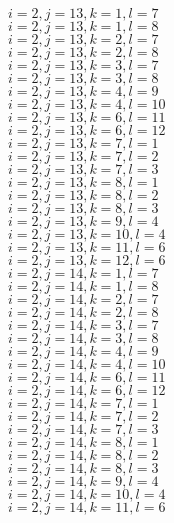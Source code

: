 \documentclass[14pt]{article}
\begin{document}
    $i=2,j=13,k=1,l=7 $ \\ 
    $i=2,j=13,k=1,l=8 $ \\ 
    $i=2,j=13,k=2,l=7 $ \\ 
    $i=2,j=13,k=2,l=8 $ \\ 
    $i=2,j=13,k=3,l=7 $ \\ 
    $i=2,j=13,k=3,l=8 $ \\ 
    $i=2,j=13,k=4,l=9 $ \\ 
    $i=2,j=13,k=4,l=10 $ \\ 
    $i=2,j=13,k=6,l=11 $ \\ 
    $i=2,j=13,k=6,l=12 $ \\ 
    $i=2,j=13,k=7,l=1 $ \\ 
    $i=2,j=13,k=7,l=2 $ \\ 
    $i=2,j=13,k=7,l=3 $ \\ 
    $i=2,j=13,k=8,l=1 $ \\ 
    $i=2,j=13,k=8,l=2 $ \\ 
    $i=2,j=13,k=8,l=3 $ \\ 
    $i=2,j=13,k=9,l=4 $ \\ 
    $i=2,j=13,k=10,l=4 $ \\ 
    $i=2,j=13,k=11,l=6 $ \\ 
    $i=2,j=13,k=12,l=6 $ \\ 
    $i=2,j=14,k=1,l=7 $ \\ 
    $i=2,j=14,k=1,l=8 $ \\ 
    $i=2,j=14,k=2,l=7 $ \\ 
    $i=2,j=14,k=2,l=8 $ \\ 
    $i=2,j=14,k=3,l=7 $ \\ 
    $i=2,j=14,k=3,l=8 $ \\ 
    $i=2,j=14,k=4,l=9 $ \\ 
    $i=2,j=14,k=4,l=10 $ \\ 
    $i=2,j=14,k=6,l=11 $ \\ 
    $i=2,j=14,k=6,l=12 $ \\ 
    $i=2,j=14,k=7,l=1 $ \\ 
    $i=2,j=14,k=7,l=2 $ \\ 
    $i=2,j=14,k=7,l=3 $ \\ 
    $i=2,j=14,k=8,l=1 $ \\ 
    $i=2,j=14,k=8,l=2 $ \\ 
    $i=2,j=14,k=8,l=3 $ \\ 
    $i=2,j=14,k=9,l=4 $ \\ 
    $i=2,j=14,k=10,l=4 $ \\ 
    $i=2,j=14,k=11,l=6 $ \\ 
\end{document}
